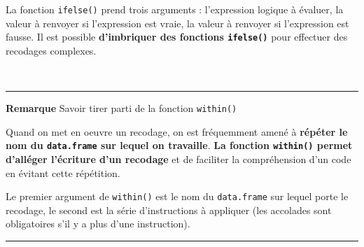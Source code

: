\documentclass[12pt,twosided, notitlepage]{book}
\newenvironment{Shaded}{}{}
\newcommand{\KeywordTok}[1]{\textcolor[rgb]{0.00,0.00,1.00}{{#1}}}
\newcommand{\StringTok}[1]{\textcolor[rgb]{0.00,0.50,0.50}{{#1}}}
\newcommand{\CommentTok}[1]{\textcolor[rgb]{0.00,0.50,0.00}{{#1}}}
\newcommand{\NormalTok}[1]{{#1}}
\renewenvironment{Shaded}{\begin{snugshade}}{\end{snugshade}}
\begin{document}
\begin{enumerate}
  La fonction \texttt{ifelse()} prend trois arguments : l'expression
  logique à évaluer, la valeur à renvoyer si l'expression est vraie, la
  valeur à renvoyer si l'expression est fausse. Il est possible
  \textbf{d'imbriquer des fonctions \texttt{ifelse()}} pour effectuer
  des recodages complexes.
\end{enumerate}

~

\begin{center}\rule{0.5\linewidth}{\linethickness}\end{center}

\textbf{Remarque} Savoir tirer parti de la fonction
\texttt{within()}

Quand on met en oeuvre un recodage, on est fréquemment amené à
\textbf{répéter le nom du \texttt{data.frame} sur lequel on travaille}.
\textbf{La fonction \texttt{within()} permet d'alléger l'écriture d'un
recodage} et de faciliter la compréhension d'un code en évitant cette
répétition.

\begin{Shaded}
\end{Shaded}

Le premier argument de \texttt{within()} est le nom du
\texttt{data.frame} sur lequel porte le recodage, le second est la série
d'instructions à appliquer (les accolades sont obligatoires s'il y a
plus d'une instruction).

\begin{center}\rule{0.5\linewidth}{\linethickness}\end{center}
\end{document}
